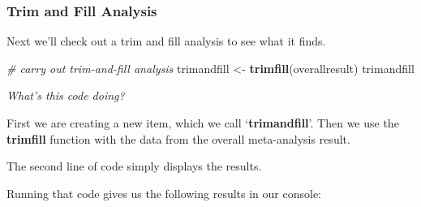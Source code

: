 \documentclass[
]{book}
\newenvironment{Shaded}{\begin{snugshade}}{\end{snugshade}}
\newcommand{\CommentTok}[1]{\textcolor[rgb]{0.56,0.35,0.01}{\textit{#1}}}
\newcommand{\FunctionTok}[1]{\textcolor[rgb]{0.13,0.29,0.53}{\textbf{#1}}}
\newcommand{\NormalTok}[1]{#1}
\newcommand{\OtherTok}[1]{\textcolor[rgb]{0.56,0.35,0.01}{#1}}
\begin{document}
\hypertarget{trim-and-fill-analysis}{%
\subsubsection{Trim and Fill Analysis}\label{trim-and-fill-analysis}}

Next we'll check out a trim and fill analysis to see what it finds.

\begin{Shaded}
\begin{Highlighting}[]
\CommentTok{\# carry out trim{-}and{-}fill analysis}
\NormalTok{trimandfill }\OtherTok{\textless{}{-}} \FunctionTok{trimfill}\NormalTok{(overallresult)}
\NormalTok{trimandfill}
\end{Highlighting}
\end{Shaded}

\emph{What's this code doing?}

First we are creating a new item, which we call `\textbf{trimandfill}'. Then we use the \textbf{trimfill} function with the data from the overall meta-analysis result.

The second line of code simply displays the results.

Running that code gives us the following results in our console:
\end{document}
